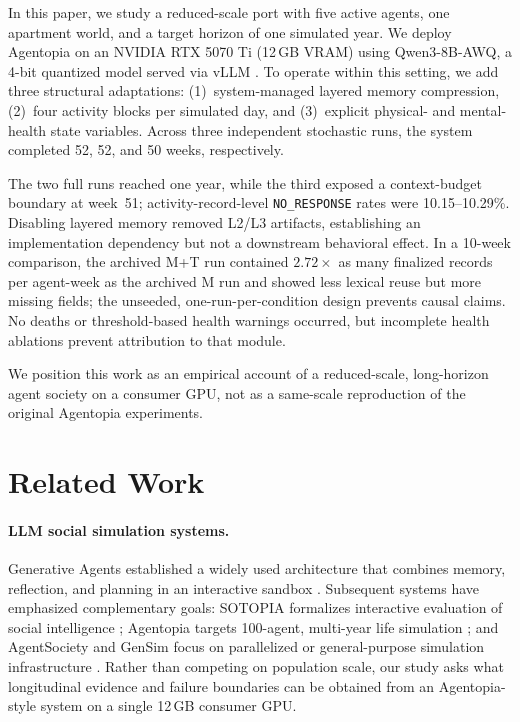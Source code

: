 \documentclass[11pt]{article}
\begin{document}
In this paper, we study a reduced-scale port with five active agents, one apartment world, and a target horizon of one simulated year.
We deploy Agentopia on an NVIDIA RTX 5070 Ti (12\,GB VRAM) using Qwen3-8B-AWQ, a 4-bit quantized model served via vLLM \citep{kwon2023vllm}.
To operate within this setting, we add three structural adaptations: (1)~system-managed layered memory compression, (2)~four activity blocks per simulated day, and (3)~explicit physical- and mental-health state variables.
Across three independent stochastic runs, the system completed 52, 52, and 50 weeks, respectively.

The two full runs reached one year, while the third exposed a context-budget boundary at week~51; activity-record-level \texttt{NO\_RESPONSE} rates were 10.15--10.29\%.
Disabling layered memory removed L2/L3 artifacts, establishing an implementation dependency but not a downstream behavioral effect.
In a 10-week comparison, the archived M+T run contained $2.72\times$ as many finalized records per agent-week as the archived M run and showed less lexical reuse but more missing fields; the unseeded, one-run-per-condition design prevents causal claims.
No deaths or threshold-based health warnings occurred, but incomplete health ablations prevent attribution to that module.

We position this work as an empirical account of a reduced-scale, long-horizon agent society on a consumer GPU, not as a same-scale reproduction of the original Agentopia experiments.

\section{Related Work}

\paragraph{LLM social simulation systems.}
Generative Agents established a widely used architecture that combines memory, reflection, and planning in an interactive sandbox \citep{park2023generative}.
Subsequent systems have emphasized complementary goals: SOTOPIA formalizes interactive evaluation of social intelligence \citep{zhou2024sotopia}; Agentopia targets 100-agent, multi-year life simulation \citep{wang2026agentopia}; and AgentSociety and GenSim focus on parallelized or general-purpose simulation infrastructure \citep{zhang2025agentsociety,tang2025gensim}.
Rather than competing on population scale, our study asks what longitudinal evidence and failure boundaries can be obtained from an Agentopia-style system on a single 12\,GB consumer GPU.
\end{document}
